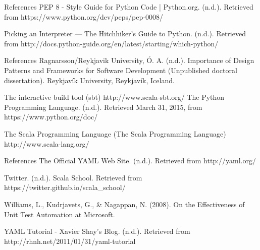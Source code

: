 \begin{thebibliography}{9}
\begin{frame}{References}
 PEP 8 - Style Guide for Python Code | Python.org. (n.d.). Retrieved from https://www.python.org/dev/peps/pep-0008/

 Picking an Interpreter — The Hitchhiker's Guide to Python. (n.d.). Retrieved from http://docs.python-guide.org/en/latest/starting/which-python/
\end{frame}

\begin{frame}{References}
Ragnarsson/Reykjavik University, Ó. A. (n.d.). Importance of Design Patterns and Frameworks for Software Development (Unpublished doctoral dissertation). Reykjavík University, Reykjavík, Iceland.

 The interactive build tool (sbt) http://www.scala-sbt.org/
The Python Programming Language. (n.d.). Retrieved March 31, 2015, from https://www.python.org/doc/

 The Scala Programming Language (The Scala Programming Language) http://www.scala-lang.org/
\end{frame}

\begin{frame}{References}
 The Official YAML Web Site. (n.d.). Retrieved from http://yaml.org/

 Twitter. (n.d.). Scala School. Retrieved from https://twitter.github.io/scala\_school/

 Williams, L., Kudrjavets, G., \& Nagappan, N. (2008). On the Effectiveness of Unit Test Automation at Microsoft.

 YAML Tutorial - Xavier Shay's Blog. (n.d.). Retrieved from http://rhnh.net/2011/01/31/yaml-tutorial
\end{frame}

\end{thebibliography}